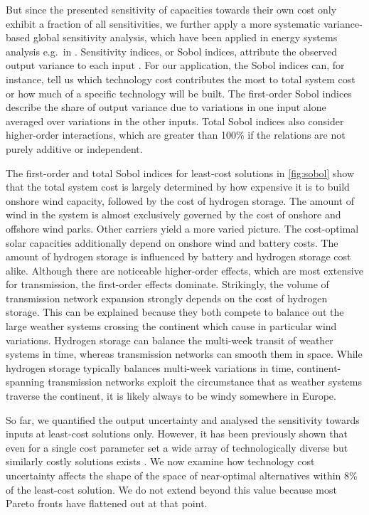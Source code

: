 But since the presented sensitivity of capacities towards their own cost only
exhibit a fraction of all sensitivities, we further apply a more systematic
variance-based global sensitivity analysis, which have been applied in energy
systems analysis e.g.~in
\cite{trondle_trade-offs_2020,mavromatidis_uncertainty_2018}. Sensitivity
indices, or Sobol indices, attribute the observed output variance to each input
\cite{sudret_global_2008}. For our application, the Sobol indices can, for
instance, tell us which technology cost contributes the most to total system
cost or how much of a specific technology will be built. The first-order Sobol
indices describe the share of output variance due to variations in one input
alone averaged over variations in the other inputs. Total Sobol indices also
consider higher-order interactions, which are greater than 100\% if the
relations are not purely additive or independent.

The first-order and total Sobol indices for least-cost solutions in
\cref{fig:sobol} show that the total system cost is largely determined by how
expensive it is to build onshore wind capacity, followed by the cost of hydrogen
storage. The amount of wind in the system is almost exclusively governed by the
cost of onshore and offshore wind parks. Other carriers yield a more varied
picture. The cost-optimal solar capacities additionally depend on onshore wind
and battery costs. The amount of hydrogen storage is influenced by battery and
hydrogen storage cost alike. Although there are noticeable higher-order effects,
which are most extensive for transmission, the first-order effects dominate.
Strikingly, the volume of transmission network expansion strongly depends on the
cost of hydrogen storage. This can be explained because they both compete to
balance out the large weather systems crossing the continent which cause in
particular wind variations. Hydrogen storage can balance the multi-week transit
of weather systems in time, whereas transmission networks can smooth them in space.
While hydrogen storage typically balances multi-week variations in time,
continent-spanning transmission networks exploit the circumstance that as
weather systems traverse the continent, it is likely always to be windy
somewhere in Europe.


So far, we quantified the output uncertainty and analysed the sensitivity
towards inputs at least-cost solutions only. However, it has been previously
shown that even for a single cost parameter set a wide array of technologically
diverse but similarly costly solutions exists \cite{nearoptimal}. We now examine
how technology cost uncertainty affects the shape of the space of near-optimal
alternatives within 8\% of the least-cost solution. We do not extend beyond this
value because most Pareto fronts have flattened out at that point.

